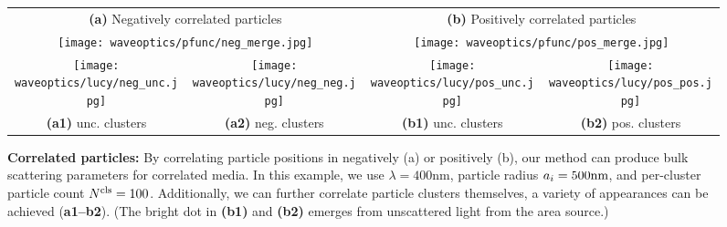 \begin{figure}[h!]
    \centering
    \setlength{\resLen}{1.45in}
    \addtolength{\tabcolsep}{-3.5pt}
    \begin{tabular}{cc|cc}
        \multicolumn{2}{c|}{\textbf{(a)} Negatively correlated particles} &
        \multicolumn{2}{c}{\textbf{(b)} Positively correlated particles}
        \\
        \multicolumn{2}{c|}{\texttt{[image: waveoptics/pfunc/neg\_merge.jpg]}} & \multicolumn{2}{c}{\texttt{[image: waveoptics/pfunc/pos\_merge.jpg]}} 
        \\
        \texttt{[image: waveoptics/lucy/neg\_unc.jpg]} &
        \texttt{[image: waveoptics/lucy/neg\_neg.jpg]} &
        \texttt{[image: waveoptics/lucy/pos\_unc.jpg]} &
        \texttt{[image: waveoptics/lucy/pos\_pos.jpg]} 
        \\
        \textbf{(a1)} unc. clusters & \textbf{(a2)} neg. clusters & \textbf{(b1)} unc. clusters & \textbf{(b2)} pos. clusters
    \end{tabular}
    \caption[Correlated particles]{\label{fig:waveoptics:correlated}
        \textbf{Correlated particles:} By correlating particle positions in negatively (a) or positively (b), our method can produce bulk scattering parameters for correlated media.
        In this example, we use $\lambda = 400\text{nm}$, particle radius $a_i = 500\text{nm}$, and per-cluster particle count ${N^\text{cls}} = 100$.
        Additionally, we can further correlate particle clusters themselves, a variety of appearances can be achieved (\textbf{a1--b2}).
        (The bright dot in \textbf{(b1)} and \textbf{(b2)} emerges from unscattered light from the area source.)
    }
\end{figure}

